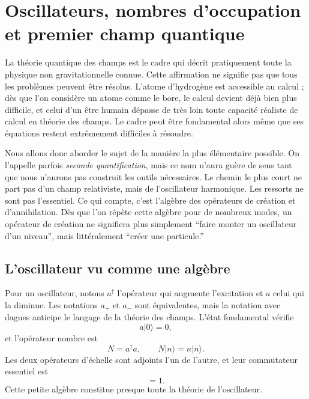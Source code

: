 \chapter{Oscillateurs, nombres d’occupation et premier champ quantique}

La théorie quantique des champs est le cadre qui décrit pratiquement toute la physique non gravitationnelle connue. Cette affirmation ne signifie pas que tous les problèmes peuvent être résolus. L’atome d’hydrogène est accessible au calcul ; dès que l’on considère un atome comme le bore, le calcul devient déjà bien plus difficile, et celui d’un être humain dépasse de très loin toute capacité réaliste de calcul en théorie des champs. Le cadre peut être fondamental alors même que ses équations restent extrêmement difficiles à résoudre.

Nous allons donc aborder le sujet de la manière la plus élémentaire possible. On l’appelle parfois \emph{seconde quantification}, mais ce nom n’aura guère de sens tant que nous n’aurons pas construit les outils nécessaires. Le chemin le plus court ne part pas d’un champ relativiste, mais de l’oscillateur harmonique. Les ressorts ne sont pas l’essentiel. Ce qui compte, c’est l’algèbre des opérateurs de création et d’annihilation. Dès que l’on répète cette algèbre pour de nombreux modes, un opérateur de création ne signifiera plus simplement ``faire monter un oscillateur d’un niveau'', mais littéralement ``créer une particule.''

\section{L’oscillateur vu comme une algèbre}

Pour un oscillateur, notons \(a^\dagger\) l’opérateur qui augmente l’excitation et \(a\) celui qui la diminue. Les notations \(a_+\) et \(a_-\) sont équivalentes, mais la notation avec dagues anticipe le langage de la théorie des champs. L’état fondamental vérifie
\begin{equation}
a|0\rangle=0,
\end{equation}
et l’opérateur nombre est
\begin{equation}
N=a^\dagger a,
\qquad
N|n\rangle=n|n\rangle.
\end{equation}
Les deux opérateurs d’échelle sont adjoints l’un de l’autre, et leur commutateur essentiel est
\begin{equation}
[a,a^\dagger]=1.
\label{eq:l06-single-commutator}
\end{equation}
Cette petite algèbre constitue presque toute la théorie de l’oscillateur.

